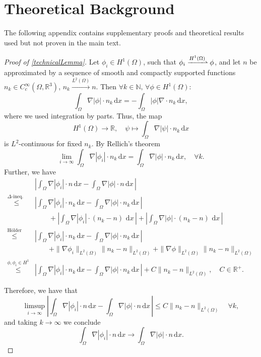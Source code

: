 \documentclass[12pt,openany]{book}
\newcommand{\R}{\mathbb{R}}
\theoremstyle{plainnormal}
\theoremstyle{remark}
\begin{document}
\chapter{Theoretical Background}\label{appendix:A}
The following appendix contains supplementary proofs and theoretical results used but not proven in the main text.
\begin{proof}[Proof of \cref{technicalLemma}]
    Let $\phi_i\in H^1(\Omega)$, such that $\phi_i\xrightharpoonup{H^1(\Omega)} \phi$, and let $n$ be approximated by a sequence of smooth and compactly supported functions $n_k\in C_c^\infty(\Omega, \R^3)$, $n_k \xrightarrow{L^2(\Omega)} n$. Then $ \forall k\in \mathbb N, \, \forall \phi \in H^1(\Omega):$
    $$\int_\Omega \nabla |\phi|\cdot n_k \,\mathrm{d}x = - \int_\Omega |\phi| \nabla \cdot n_k \,\mathrm{d}x,$$
    where we used integration by parts. Thus, the map $$
    H^1(\Omega) \rightarrow\R,\quad
        \psi \mapsto \int_\Omega \nabla |\psi|\cdot n_k \,\mathrm{d}x
     $$ 
    is $L^2$-continuous for fixed $n_k$. By Rellich's theorem $$\lim_{i\rightarrow\infty}\int_\Omega \nabla |\phi_i|\cdot n_k \,\mathrm{d}x = \int_\Omega \nabla |\phi|\cdot n_k \,\mathrm{d}x, \quad \forall k.$$ Further, we have
    \begin{align*}
        &\left|\int_\Omega \nabla |\phi_i|\cdot n \,\mathrm{d}x - \int_\Omega \nabla |\phi|\cdot n \,\mathrm{d}x\,\right|\\
       \overset{\Delta\text{-ineq.        }\,}{\leq} &\left|\int_\Omega \nabla |\phi_i|\cdot n_k \,\mathrm{d}x - \int_\Omega \nabla |\phi|\cdot n_k \,\mathrm{d}x\,\right| \\&\quad \quad + \left| \int_\Omega \nabla |\phi_i| \cdot (n_k - n) \, \,\mathrm{d}x\, \right| 
 + \left| \int_\Omega \nabla |\phi| \cdot (n_k - n) \, \,\mathrm{d}x\, \right|\\
       \overset{\text{Hölder}}{\leq} &\left|\int_\Omega \nabla |\phi_i|\cdot n_k \,\mathrm{d}x - \int_\Omega \nabla |\phi|\cdot n_k \,\mathrm{d}x\,\right| \\ &\quad \quad+ \|\nabla \phi_i\|_{L^2(\Omega)} \|n_k - n\|_{L^2(\Omega)}  + \|\nabla \phi\|_{L^2(\Omega)} \|n_k - n\|_{L^2(\Omega)}\\
       \overset{\phi, \phi_i \in H^1 }{\leq} &\left|\int_\Omega \nabla |\phi_i|\cdot n_k \,\mathrm{d}x - \int_\Omega \nabla |\phi|\cdot n_k \,\mathrm{d}x\,\right| + C\|n_k - n\|_{L^2(\Omega)},\quad C\in \R^+.
    \end{align*}
    
    Therefore, we have that $$\limsup_{i\rightarrow\infty} \left| \int_\Omega \nabla |\phi_i|\cdot n \,\mathrm{d}x - \int_\Omega \nabla |\phi|\cdot n \,\mathrm{d}x\,\right| \leq C\|n_k - n\|_{L^2(\Omega)}\quad \forall k,$$ and taking $k\rightarrow\infty$ we conclude $$\int_\Omega \nabla |\phi_i|\cdot n \,\mathrm{d}x \rightarrow\int_\Omega \nabla |\phi|\cdot n \,\mathrm{d}x.$$
\end{proof}
\end{document}
